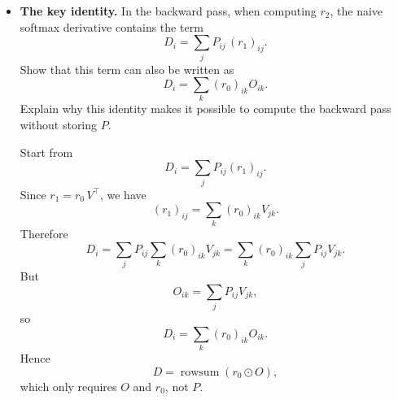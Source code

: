 \documentclass{article}
\theoremstyle{definition}
\theoremstyle{remark}
\begin{document}
\begin{itemize}
\begin{solution}
        For the backward pass, if $r_0$ is the reverse tangent (at node $O$), then
        \[
        r_5=P^\top r_0,\qquad
        r_1=r_0\,V^\top,\qquad
        r_2=P\odot\bigl(r_1-((P\odot r_1)\mathbf{1})\mathbf{1}^\top\bigr).
        \]
        Note each line of $D := (P\odot r_1)\mathbf{1}$ is $D_i := \left[(P\odot r_1)\mathbf{1}\right]_i = \sum_j P_{ij} (r_1)_{ij}$ (see exercise $5$ for the adjoint jacobian of the softmax function applied to a row vector). Finally
        \[
        r_3=\frac{r_2\,K}{\sqrt d},\qquad
        r_4=\frac{r_2^\top Q}{\sqrt d}.
        \]
    \end{solution}

    \item \textbf{The key identity.}
    In the backward pass, when computing $r_2$, the naive softmax derivative contains the term
    \[
    D_i = \sum_j P_{ij}\,(r_1)_{ij}.
    \]
    Show that this term can also be written as
    \[
    D_i = \sum_k (r_0)_{ik} O_{ik}.
    \]
    Explain why this identity makes it possible to compute the backward pass without storing $P$.

    \begin{solution}
        Start from
        \[
        D_i=\sum_j P_{ij}(r_1)_{ij}.
        \]
        Since $r_1=r_0\,V^\top$, we have
        \[
        (r_1)_{ij}=\sum_k (r_0)_{ik}V_{jk}.
        \]
        Therefore
        \[
        D_i=\sum_j P_{ij}\sum_k (r_0)_{ik}V_{jk}
        =\sum_k (r_0)_{ik}\sum_j P_{ij}V_{jk}.
        \]
        But
        \[
        O_{ik}=\sum_j P_{ij}V_{jk},
        \]
        so
        \[
        D_i=\sum_k (r_0)_{ik}O_{ik}.
        \]
        Hence
        \[
        D=\operatorname{rowsum}(r_0\odot O),
        \]
        which only requires $O$ and $r_0$, not $P$.
    \end{solution}
\end{itemize}
\end{document}
